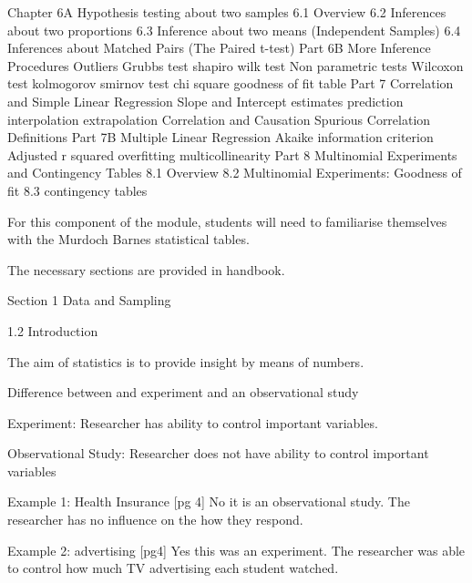 Chapter 6A Hypothesis testing about two samples
6.1 Overview
6.2 Inferences about two proportions
6.3 Inference about two means (Independent Samples)
6.4 Inferences about Matched Pairs (The Paired t-test)
Part 6B More Inference Procedures
Outliers Grubbs test
shapiro wilk test
Non parametric tests 
Wilcoxon test
kolmogorov smirnov test
chi square goodness of fit table
Part 7 Correlation and Simple Linear Regression
Slope and Intercept estimates
prediction
interpolation extrapolation
Correlation and Causation
Spurious Correlation 
Definitions 
Part 7B Multiple Linear Regression
Akaike information criterion
Adjusted r squared
overfitting 
multicollinearity
Part 8 Multinomial Experiments and Contingency Tables
8.1 Overview
8.2 Multinomial Experiments: Goodness of fit
8.3 contingency tables

\newpage

For this component of the module, students will need to familiarise themselves with the Murdoch Barnes statistical tables.

The necessary sections are provided in handbook.

Section 1 Data and Sampling


1.2   Introduction 

The aim of statistics is to provide insight by means of numbers.

Difference between and experiment and an observational study

Experiment: Researcher has ability to control important variables.

Observational Study: Researcher does not have ability to control important variables



Example 1:  Health Insurance [pg 4]
No it is an observational study. The researcher has no influence on the how they respond.

Example 2:  advertising  [pg4]
Yes this was an experiment. The researcher was able to control how much TV advertising each student watched.



